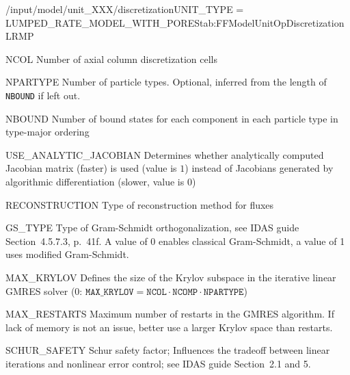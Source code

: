 \begin{condsubgroup}{/input/model/unit\_XXX/discretization}{UNIT\_TYPE = LUMPED\_RATE\_MODEL\_WITH\_PORES}{tab:FFModelUnitOpDiscretizationLRMP}
  \begin{dataset}[type=int,range={$\geq 1$},length=1]{NCOL}
    Number of axial column discretization cells
  \end{dataset}
  \begin{dataset}[type=int,range={$\geq 1$},length=1]{NPARTYPE}
    Number of particle types.
    Optional, inferred from the length of \texttt{NBOUND} if left out.
  \end{dataset}
  \begin{dataset}[type=int,range={$\geq 0$},length={\texttt{NCOMP} / $\texttt{NPARTYPE} \cdot \texttt{NCOMP}$}]{NBOUND}
    Number of bound states for each component in each particle type in type-major ordering
  \end{dataset}
  \begin{dataset}[type=int,range={$\{0, 1\}$},length=1]{USE\_ANALYTIC\_JACOBIAN}
    Determines whether analytically computed Jacobian matrix (faster) is used (value is $1$) instead of Jacobians generated by algorithmic differentiation (slower, value is $0$)
  \end{dataset}
  \begin{dataset}[type=string,range={\texttt{WENO}},length={1}]{RECONSTRUCTION}
    Type of reconstruction method for fluxes
  \end{dataset}
  \begin{dataset}[type=int,range={$\{0, 1\}$},length=1]{GS\_TYPE}
    Type of Gram-Schmidt orthogonalization, see IDAS guide Section~4.5.7.3, p.~41f.
    A value of $0$ enables classical Gram-Schmidt, a value of 1 uses modified Gram-Schmidt.
  \end{dataset}
  \begin{dataset}[type=int,range={$\{0, \dots, \texttt{NCOL} \cdot \texttt{NCOMP} \cdot \texttt{NPARTYPE} \}$},length=1]{MAX\_KRYLOV}
    Defines the size of the Krylov subspace in the iterative linear GMRES solver (0: $\texttt{MAX\_KRYLOV} = \texttt{NCOL} \cdot \texttt{NCOMP} \cdot \texttt{NPARTYPE}$)
  \end{dataset}
  \begin{dataset}[type=int,range={$\geq 0$},length=1]{MAX\_RESTARTS}
    Maximum number of restarts in the GMRES algorithm. If lack of memory is not an issue, better use a larger Krylov space than restarts.
  \end{dataset}
  \begin{dataset}[type=double,range={$\geq 0$},length=1]{SCHUR\_SAFETY}
    Schur safety factor; Influences the tradeoff between linear iterations and nonlinear error control; see IDAS guide Section~2.1 and 5.
  \end{dataset}
\end{condsubgroup}

